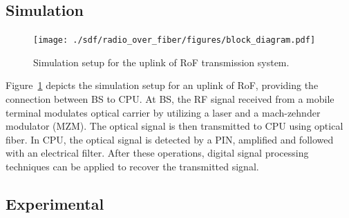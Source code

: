 \subsection{Simulation}
\begin{figure}[h!]
    \centering
    \texttt{[image: ./sdf/radio\_over\_fiber/figures/block\_diagram.pdf]}
    \caption{Simulation setup for the uplink of RoF transmission system.}
    \label{fig_RoFdiagram}
\end{figure}

 Figure~\ref{fig_RoFdiagram} depicts the simulation setup for an uplink of RoF, providing the connection between BS to CPU. At BS, the RF signal received from a mobile terminal modulates optical carrier by utilizing a laser and a mach-zehnder modulator (MZM). The optical signal is then transmitted to CPU using optical fiber. In CPU, the optical signal is detected by a PIN, amplified and followed with an electrical filter. After these operations, digital signal processing techniques can be applied to recover the transmitted signal.


\subsection{Experimental}
